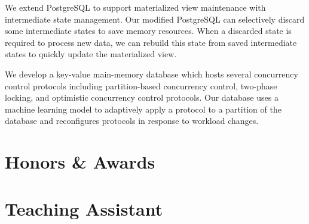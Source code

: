 \documentclass[10pt]{article} %
\begin{document}
{We extend PostgreSQL to support materialized view maintenance with intermediate state management. 
Our modified PostgreSQL can selectively discard some intermediate states to save memory resources. 
When a discarded state is required to process new data, we can rebuild this state from saved intermediate states 
to quickly update the materialized view.
}

{We develop a key-value main-memory database which hosts several concurrency control protocols 
including partition-based concurrency control, two-phase locking, and optimistic concurrency control protocols. 
Our database uses a machine learning model to adaptively apply a protocol to a partition of the database 
and reconfigures protocols in response to workload changes.}



\section{Honors \& Awards}

\vspace{-5mm}



\section{Teaching Assistant}

\vspace{-5mm}
\end{document}
